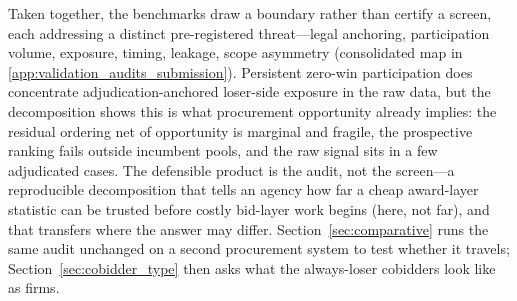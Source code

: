 Taken together, the benchmarks draw a boundary rather than certify
a screen, each addressing a distinct pre-registered threat---legal
anchoring, participation volume, exposure, timing, leakage, scope
asymmetry (consolidated map in
\ref{app:validation_audits_submission}). Persistent zero-win
participation does concentrate adjudication-anchored loser-side
exposure in the raw data, but the decomposition shows this is what
procurement opportunity already implies: the residual ordering net
of opportunity is marginal and fragile, the prospective ranking
fails outside incumbent pools, and the raw signal sits in a few
adjudicated cases. The defensible product is the audit, not the
screen---a reproducible decomposition that tells an agency how far
a cheap award-layer statistic can be trusted before costly
bid-layer work begins (here, not far), and that transfers where the
answer may differ. Section~\ref{sec:comparative} runs the same
audit unchanged on a second procurement system to test whether it
travels; Section~\ref{sec:cobidder_type} then asks what the
always-loser cobidders look like as firms.
